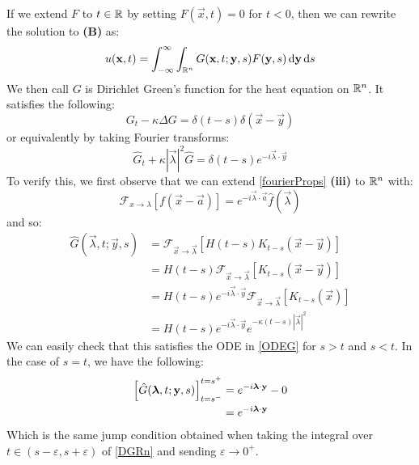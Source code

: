 \documentclass[../main.tex]{subfiles}
\begin{document}
If we extend $F$ to $t \in \mathbb{R}$ by setting $F(\vec{x}, t) = 0$ for $t < 0$, then we can rewrite the solution to \textbf{(B)} as:
\[
  u(\vec{x}, t) = \int_{-\infty}^{\infty} \int_{\R^{n}} G(\vec{x}, t; \vec{y}, s) F(\vec{y}, s) \d{\vec{y}} \d{s}
\]
We then call $G$ is Dirichlet Green's function for the heat equation on $\mathbb{R}^{n}$.
It satisfies the following:
\begin{equation}
  G_t - \kappa \Delta G = \delta(t - s) \delta(\vec{x} - \vec{y}) \label{DGRn} \tag{$\dag$}
\end{equation}
or equivalently by taking Fourier transforms:
\begin{equation}
  \hat{G}_t + \kappa |\vec{\lambda}|^2 \hat{G} = \delta(t - s) e^{-i \vec{\lambda} \cdot \vec{y}} \label{ODEG} \tag{$\star$}
\end{equation}
To verify this, we first observe that we can extend \cref{fourierProps} \textbf{(iii)} to $\mathbb{R}^{n}$ with:
\begin{equation}
  \mathcal{F}_{x \to \lambda}\left[f(\vec{x} - \vec{a})\right] = e^{-i \vec{\lambda} \cdot \vec{a}} \hat{f}(\vec{\lambda}) \label{FTShift}
\end{equation}
and so:
\begin{align*}
  \hat{G}(\vec{\lambda}, t; \vec{y}, s) &= \mathcal{F}_{\vec{x} \to \vec{\lambda}}[H(t - s)K_{t - s}(\vec{x} - \vec{y})] \\
                                        &= H(t - s) \mathcal{F}_{\vec{x} \to \vec{\lambda}} [K_{t - s}(\vec{x} - \vec{y})] \\
                                        &= H(t - s) e^{-i \vec{\lambda} \cdot \vec{y}} \mathcal{F}_{\vec{x} \to \vec{\lambda}}[K_{t - s}(\vec{x})] \\
                                        &= H(t - s) e^{-i \vec{\lambda} \cdot \vec{y}} e^{-\kappa(t - s)|\vec{\lambda}|^2}
\end{align*}
We can easily check that this satisfies the ODE in \cref{ODEG} for $s > t$ and $s < t$.
In the case of $s = t$, we have the following:
\begin{align*}
  \left[\hat{G}(\mathbf{\bm{\lambda}}, t; \mathbf{\bm{y}}, s)\right]_{t = s^{-}}^{t = s^{+}} &= e^{-i \mathbf{\bm{\lambda}} \cdot \mathbf{\bm{y}}} - 0\\
                                                                     &= e^{-i \mathbf{\bm{\lambda}} \cdot \mathbf{\bm{y}}}
\end{align*}
Which is the same jump condition obtained when taking the integral over $t \in (s - \varepsilon, s + \varepsilon)$ of \cref{DGRn} and sending $\varepsilon \to 0^{+}$.
\end{document}
